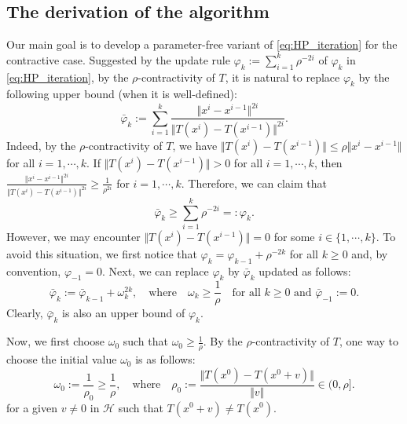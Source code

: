 \documentclass{article}
\theoremstyle{plain}
\theoremstyle{definition}
\newcommand{\Hil}{\mathcal{H}}
\newcommand{\sets}[1]{\{#1\}}
\newcommand{\norms}[1]{\Vert#1\Vert}
\newcommand{\0}{\boldsymbol{0}}
\begin{document}
\subsection{The derivation of the algorithm}\label{subsec:derivation_of_A1}
Our main goal is to develop a parameter-free variant of \eqref{eq:HP_iteration} for the contractive case.
Suggested by the update rule $\varphi_k := \sum_{i=1}^k\rho^{-2i}$  of $\varphi_k$ in \eqref{eq:HP_iteration}, by the $\rho$-contractivity of $T$, it is natural to replace $\varphi_k$ by the following upper bound (when it is well-defined):
\begin{equation}\label{eq:new_stepsize0}
\bar{\varphi}_k := \sum_{i=1}^k\frac{\norms{x^i - x^{i-1}}^{2i}}{\norms{T(x^i) - T(x^{i-1})}^{2i}}.
\end{equation}
Indeed, by the $\rho$-contractivity  of $T$, we have $\norms{T(x^i) - T(x^{i-1})} \leq \rho\norms{x^i - x^{i-1}}$ for all $i = 1,\cdots, k$.
If $\norms{T(x^i) - T(x^{i-1})} > 0$ for all $i=1,\cdots, k$, then $\frac{\norms{x^i - x^{i-1}}^{2i}}{\norms{T(x^i) - T(x^{i-1})}^{2i}} \geq \frac{1}{\rho^{2i}}$ for $i=1,\cdots, k$.
Therefore, we can claim that
\begin{equation}\label{eq:new_stepsize0_bound}
\bar{\varphi}_k \geq \sum_{i=1}^k\rho^{-2i} =: \varphi_k.
\end{equation}
However, we may encounter $\norms{T(x^i) - T(x^{i-1})} = 0$ for some $i \in \sets{1, \cdots, k}$.
To avoid this situation, we first notice that $\varphi_k = \varphi_{k-1} + \rho^{-2k}$ for all $k \geq 0$ and, by convention, $\varphi_{-1} = 0$.
Next, we can replace $\varphi_k$ by $\bar{\varphi}_k$ updated as follows:
\begin{equation}\label{eq:new_stepsize}
\bar{\varphi}_k := \bar{\varphi}_{k-1} + \omega_k^{2k}, \quad \textrm{where} \quad \omega_k \geq \frac{1}{\rho} \quad \textrm{for all $k \geq 0$ and $\bar{\varphi}_{-1} := 0$}.
\end{equation}
Clearly, $\bar{\varphi}_k$ is also an upper bound of $\varphi_k$.

Now, we first choose $\omega_0$ such that $\omega_0 \geq \frac{1}{\rho}$.
By the $\rho$-contractivity of $T$, one way to choose the initial value $\omega_0$ is as follows:
\begin{equation}\label{eq:omega_0_choice}
\omega_0 := \frac{1}{\rho_0} \geq \frac{1}{\rho},\quad \textrm{where} \quad \rho_0 := \frac{\norms{T(x^0) - T(x^0 + v)}}{\norms{v}} \in (0,  \rho].
\end{equation}
for a given $v \neq 0$ in $\Hil$ such that $T(x^0 + v) \neq T(x^0)$.
\end{document}
